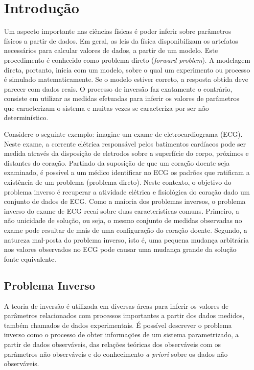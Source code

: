 \chapter{Introdução}
\label{cap:1intro}

Um aspecto importante nas ciências físicas é poder inferir sobre parâmetros
físicos a partir de dados. Em geral, as leis da física disponibilizam os
artefatos necessários para calcular valores de dados, a partir de um modelo.
Este procedimento é conhecido como problema direto (\textit{forward problem}).
A modelagem direta, portanto, inicia com um modelo, sobre o qual um experimento ou processo
é simulado matematicamente. Se o modelo estiver correto, a resposta
obtida deve parecer com dados reais. O processo de inversão faz exatamente o contrário,
consiste em utilizar as medidas efetuadas para inferir os valores de parâmetros que
caracterizam o sistema \citep{tarantola} e muitas vezes se caracteriza
por ser não determinístico.

Considere o seguinte exemplo: imagine um exame de eletrocardiograma (ECG). Neste exame,
a corrente elétrica responsável pelos batimentos cardíacos
pode ser medida através da disposição de eletrodos sobre a superfície do corpo,
próximos e distantes do coração. Partindo da suposição de que um coração doente
seja examinado, é possível a um médico identificar no ECG os padrões que ratificam
a existência de um problema (problema direto). Neste contexto, o objetivo do problema inverso
é recuperar a atividade elétrica e fisiológica do coração dado um conjunto de dados de ECG.
Como a maioria dos problemas inversos, o problema inverso do exame de ECG recai sobre duas características
comuns. Primeiro, a não unicidade de solução, ou seja, o mesmo conjunto de medidas
observadas no exame pode resultar de mais de uma configuração do coração doente. Segundo,
a natureza mal-posta do problema inverso, isto é, uma pequena mudança arbitrária nos
valores observados no ECG pode causar uma mudança grande da solução fonte equivalente.

\section{Problema Inverso}

A teoria de inversão é utilizada em diversas áreas para inferir os valores de
parâmetros relacionados com processos importantes a partir dos dados medidos,
também chamados de dados experimentais. É possível descrever o problema inverso
como o processo de obter informações de um sistema parametrizado, a partir de
dados observáveis, das relações teóricas dos observáveis com os parâmetros não
observáveis e do conhecimento \textit{a priori} sobre os dados não observáveis.

